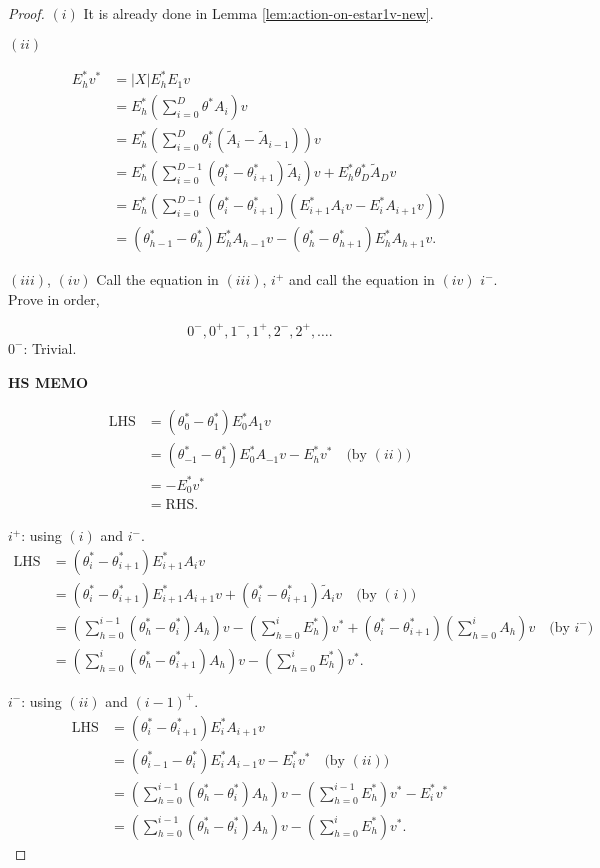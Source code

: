 \documentclass[
]{book}
\theoremstyle{definition}
\theoremstyle{definition}
\theoremstyle{definition}
\theoremstyle{definition}
\theoremstyle{remark}
\begin{document}
\begin{proof}
\leavevmode

\((i)\) It is already done in Lemma \ref{lem:action-on-estar1v-new}.

\((ii)\)

\begin{align}
E^*_hv^* & = |X|E^*_hE_1v\\
& = E^*_h\left(\sum_{i=0}^D\theta^*A_i\right)v\\
& = E^*_h\left(\sum_{i=0}^D\theta^*_i(\tilde{A}_i-\tilde{A}_{i-1})\right)v\\
& = E^*_h\left(\sum_{i=0}^{D-1}(\theta^*_i-\theta^*_{i+1})\tilde{A}_i\right)v + E^*_h\theta^*_D\tilde{A}_D v\\
& = E^*_h\left(\sum_{i=0}^{D-1}(\theta^*_i-\theta^*_{i+1})(E^*_{i+1}A_iv - E^*_iA_{i+1}v)\right)\\
& = (\theta^*_{h-1}-\theta^*_h)E^*_hA_{h-1}v - (\theta^*_h-\theta^*_{h+1})E^*_hA_{h+1}v.
\end{align}

\((iii)\), \((iv)\) Call the equation in \((iii)\), \(i^+\) and call the equation in \((iv)\) \(i^-\). Prove in order,

\[0^-, 0^+, 1^-, 1^+, 2^-, 2^+, \ldots .\]
\(0^-\): Trivial.

\textbf{HS MEMO}

\begin{align}
\mathrm{LHS} & = (\theta^*_0 - \theta^*_1)E^*_0A_1v \\
& = (\theta^*_{-1}-\theta^*_1)E^*_0A_{-1}v - E^*_hv^* \quad \text{(by $(ii)$)}\\
& = -E^*_0v^*\\
& = \mathrm{RHS}.
\end{align}

\(i^+\): using \((i)\) and \(i^-\).
\begin{align}
\mathrm{LHS} & = (\theta^*_i - \theta^*_{i+1})E^*_{i+1}A_iv \\
& = (\theta^*_{i}-\theta^*_{i+1})E^*_{i+1}A_{i+1}v + (\theta^*_i-\theta^*_{i+1})\tilde{A}_iv \quad \text{(by $(i)$)}\\
& = \left(\sum_{h=0}^{i-1}(\theta^*_h-\theta^*_{i})A_h\right)v - \left(\sum_{h=0}^i E^*_h\right)v^* + (\theta^*_i-\theta^*_{i+1})\left(\sum_{h=0}^i A_h\right)v \quad \text{(by $i^-$)}\\
& = \left(\sum_{h=0}^i (\theta^*_h-\theta^*_{i+1})A_h\right)v - \left(\sum_{h=0}^i E^*_h\right)v^*.
\end{align}

\(i^-\): using \((ii)\) and \((i-1)^+\).
\begin{align}
\mathrm{LHS} & = (\theta^*_i - \theta^*_{i+1})E^*_{i}A_{i+1}v \\
& = (\theta^*_{i-1}-\theta^*_{i})E^*_{i}A_{i-1}v - E^*_iv^* \quad \text{(by $(ii)$)}\\
& = \left(\sum_{h=0}^{i-1}(\theta^*_h-\theta^*_{i})A_h\right)v - \left(\sum_{h=0}^{i-1} E^*_h\right)v^* - E^*_iv^*\\ 
& = \left(\sum_{h=0}^{i-1} (\theta^*_h-\theta^*_{i})A_h\right)v - \left(\sum_{h=0}^i E^*_h\right)v^*.
\end{align}


\end{proof}
\end{document}
